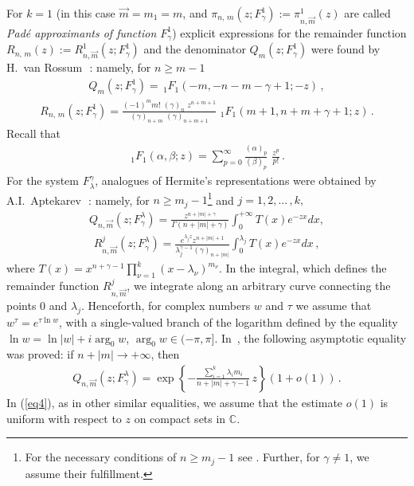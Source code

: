 \documentclass[
11pt,%
tightenlines,%
twoside,%
onecolumn,%
nofloats,%
nobibnotes,%
nofootinbib,%
superscriptaddress,%
noshowpacs,%
centertags]%
{revtex4}
\begin{document}
For $k=1$ (in this case $\overrightarrow{m}=m_1=m$, and
$\pi_{n,\,m}(z;F_{\gamma}^{1}):=\pi_{n,\overrightarrow{m}}^1(z)$
are called {\it Pad\'e approximants of function $F_{\gamma}^{1}$})
explicit expressions for the remainder function
$R_{n,\,m}(z):=R^1_{n,\overrightarrow{m}}(z;F_{\gamma}^{1})$
and the denominator $Q_m(z;F_{\gamma}^{1})$ were found by
H.~van Rossum~\cite{Rossum}\,: namely, for $n\geqslant m-1$
  \begin{eqnarray*}
  Q_m(z;F_{\gamma}^{1})=\,_1F_1(-m,-n-m-\gamma+1;-z)\,,
  \end{eqnarray*}
\begin{eqnarray}\label{eq2}
  R_{n,\,m}(z;F_{\gamma}^{1})
=\frac{(-1)^m m!\,\,(\gamma)_n\,\,
z^{n+m+1}}{(\gamma)_{n+m}\,\,(\gamma)_{n+m+1}}\,
\,_1F_1(m+1,n+m+\gamma+1;z)\,.
\end{eqnarray}
Recall that
\begin{eqnarray*}
  \,_1F_1(\alpha,\beta;z)=\sum_{p=0}^{\infty}
  \frac{(\alpha)_p}{(\beta)_p}\,\,
  \frac{z^p}{p!}\,.
\end{eqnarray*}
For the system $F_{\lambda}^{\gamma}$, analogues of Hermite's
representations were obtained by A.I.~Aptekarev~\cite{Aptek}\,:
namely, for $n\geqslant m_j-1$\footnote{For the necessary
conditions of $n\geqslant m_j-1$ see \cite{Star1}.
Further, for $\gamma\neq 1$, we assume their fulfillment.}
and $j=1,2,...\,,k,$
\begin{eqnarray*}
Q_{n,\overrightarrow{m}}(z;F^{\lambda}_{\gamma})=
\frac{z^{n+|m|+\gamma}}{\Gamma(n+|m|+\gamma)} \int_0^{+\infty}T(x)
 e^{-zx}dx,
\end{eqnarray*}
\begin{eqnarray}\label{eq3}
R_{n,\overrightarrow{m}}^j(z;F^{\lambda}_{\gamma})=\frac{e^{\lambda_jz}z^{n+|m|+1}}
{\lambda_j^{\gamma-1}(\gamma)_{n+|m|}} \int_0^{\lambda_j}T(x)
  e^{-zx}dx\,,
\end{eqnarray}
where $T(x)=x^{n+\gamma-1}\prod_{\nu=1}^k(x-\lambda_{\nu})^{m_{\nu}}$.
In the integral, which defines the remainder function 
$R_{n,\overrightarrow{m}}^j$, we integrate along an arbitrary 
curve connecting the points $0$ and $\lambda_j$.
Henceforth, for complex numbers $w$ and $\tau$ we assume that
$w^{\tau}= e^{\tau\ln w}$, with a single-valued branch of
the logarithm defined by the equality $\ln w=\ln |w|+i\arg_0 w$,
$\arg_0 w\in (-\pi, \pi]$.
In~\cite{Aptek}, the following asymptotic equality 
was proved: if $n+|m|\rightarrow +\infty$, then
\begin{eqnarray}\label{eq4}
  Q_{n,\overrightarrow{m}}(z;F^{\lambda}_{\gamma})=\exp\left\{-\frac{\sum^k_{i=1}
  \lambda_i m_i}{n+|m|+\gamma-1}\, z\right\}
  (1+o(1))\,.
\end{eqnarray}
In (\ref{eq4}), as in other similar equalities, we assume that the estimate $o(1)$
is uniform with respect to $z$ on compact sets in $\mathbb{C}$.
\end{document}
